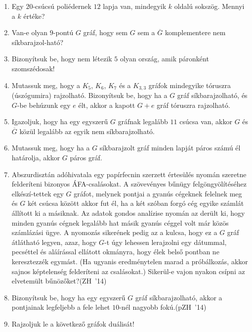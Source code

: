 \documentclass[a4paper, 12pt]{article}
\begin{document}
\begin{enumerate}
\begin{figure}[h]
	\end{figure}
	\item Egy $20$-csúcsú poliédernek $12$ lapja van, mindegyik $k$ oldalú sokszög. Mennyi a $k$ értéke?
	\item Van-e olyan $9$-pontú $G$ gráf, hogy sem $G$ sem a $\overline{G}$ komplementere nem síkbarajzol-ható?
	\item Bizonyítsuk be, hogy nem létezik $5$ olyan ország, amik páronként szomszédosak!
	\item Mutassuk meg, hogy a $K_5$, $K_6$, $K_7$ és a $K_{3,3}$ gráfok mindegyike tóruszra (úszógumira) rajzolható. Bizonyítsuk be, hogy ha a $G$ gráf síkbarajzolható, és $G$-be behúzunk egy $e$ élt, akkor a kapott $G+e$ gráf tóruszra rajzolható.
	\item Igazoljuk, hogy ha egy egyszerű $G$ gráfnak legalább $11$ csúcsa van, akkor $G$ és $\overline G$ közül legalább az egyik nem síkbarajzolható.
	\item Mutassuk meg, hogy ha a $G$ síkbarajzolt gráf minden lapját páros számú él határolja, akkor $G$ páros gráf.
	\item Abszurdisztán adóhivatala egy papírfecnin szerzett értesülés nyomán szeretne felderíteni bizonyos ÁFA-csalásokat. A szövevényes bűnügy felgöngyölítéséhez elkészí-tettek egy $G$ gráfot, melynek pontjai a gyanús cégeknek felelnek meg és $G$ két csúcsa között akkor fut él, ha a két szóban forgó cég egyike számlát állított ki a másiknak. Az adatok gondos analízise nyomán az derült ki, hogy minden gyanús cégnek legalább hat másik gyanús céggel volt már közös számlázási ügye. A nyomozás sikerének pedig az a kulcsa, hogy ez a $G$ gráf átlátható legyen, azaz, hogy $G$-t úgy lehessen lerajzolni egy
dátummal, pecséttel és aláírással ellátott okmányra, hogy élek belső pontban ne keresztezzék egymást. (Ha ugyanis eredménytelen marad a próbálkozás, akkor sajnos képtelenség felderíteni az csalásokat.) Sikerül-e vajon nyakon csípni az elvetemült bűnözőket?\hspace*{0em}\hfill\hbox{(ZH '14)}
	\item Bizonyítsuk be, hogy ha egy egyszerű $G$ gráf síkbarajzolható, akkor a pontjainak legfeljebb a fele lehet $10$-nél nagyobb fokú.\hspace*{0em}\hfill\hbox{(pZH '14)}
	\item Rajzoljuk le a következő gráfok duálisát!
	\begin{figure}[h]
		\centering
		\begin{subfigure}[b]{0.3\textwidth}
			\centering
			\caption{}
			
		\end{subfigure}
		\begin{subfigure}[b]{0.3\textwidth}
			\centering
			\caption{}
			
		\end{subfigure}
		\begin{subfigure}[b]{0.3\textwidth}
			\centering
			\caption{}
			
		\end{subfigure}
	\end{figure}
	

\end{enumerate}
\end{document}
